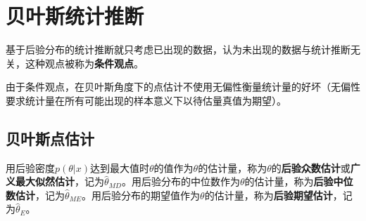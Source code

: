 \section{贝叶斯统计推断}
\begin{definition}
	基于后验分布的统计推断就只考虑已出现的数据，认为未出现的数据与统计推断无关，这种观点被称为\textbf{条件观点}。
\end{definition}
\begin{note}
	由于条件观点，在贝叶斯角度下的点估计不使用无偏性衡量统计量的好坏（无偏性要求统计量在所有可能出现的样本意义下以待估量真值为期望）。
\end{note}

\subsection{贝叶斯点估计}
\begin{definition}
	用后验密度$p(\theta|x)$达到最大值时$\theta$的值作为$\theta$的估计量，称为$\theta$的\textbf{后验众数估计}或\textbf{广义最大似然估计}，记为$\hat{\theta}_{MD}$。用后验分布的中位数作为$\theta$的估计量，称为\textbf{后验中位数估计}，记为$\hat{\theta}_{ME}$。用后验分布的期望值作为$\theta$的估计量，称为\textbf{后验期望估计}，记为$\hat{\theta}_E$。
\end{definition}
